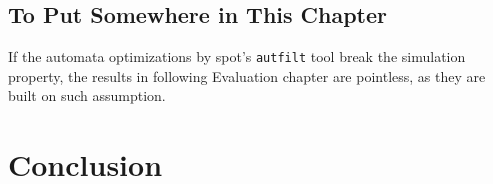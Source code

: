 \documentclass[
	digital
nolof, nolot
]{fithesis3}
\begin{document}
		\section{To Put Somewhere in This Chapter}
		If the automata optimizations by spot's 
		\texttt{autfilt} tool break the simulation property, the results in following Evaluation chapter are pointless, as they are built on such assumption.
	\chapter{Conclusion}
\end{document}

